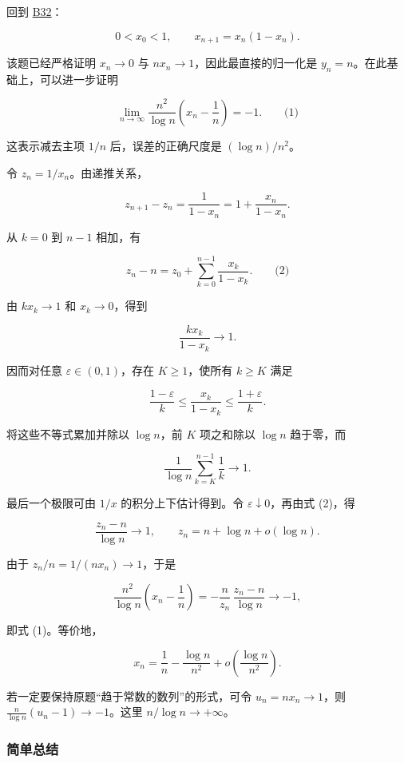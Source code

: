 \documentclass[11pt,a4paper]{article}
\begin{document}
回到
\href{https://zj139.github.io/math-notes/problems/e7f87e98efda5bacdd444c79/\#问题-b32}{B32}：

\[
0<x_0<1,\qquad x_{n+1}=x_n(1-x_n).
\]

该题已经严格证明 \(x_n\to0\) 与 \(nx_n\to1\)，因此最直接的归一化是
\(y_n=n\)。在此基础上，可以进一步证明

\[
\boxed{\lim_{n\to\infty}\frac{n^2}{\log n}\left(x_n-\frac1n\right)=-1.}
\qquad\text{(1)}
\]

这表示减去主项 \(1/n\) 后，误差的正确尺度是 \((\log n)/n^2\)。

令 \(z_n=1/x_n\)。由递推关系，

\[
z_{n+1}-z_n
=\frac1{1-x_n}
=1+\frac{x_n}{1-x_n}.
\]

从 \(k=0\) 到 \(n-1\) 相加，有

\[
z_n-n=z_0+\sum_{k=0}^{n-1}\frac{x_k}{1-x_k}.
\qquad\text{(2)}
\]

由 \(kx_k\to1\) 和 \(x_k\to0\)，得到

\[
\frac{kx_k}{1-x_k}\longrightarrow1.
\]

因而对任意 \(\varepsilon\in(0,1)\)，存在 \(K\ge1\)，使所有 \(k\ge K\)
满足

\[
\frac{1-\varepsilon}{k}
\le\frac{x_k}{1-x_k}
\le\frac{1+\varepsilon}{k}.
\]

将这些不等式累加并除以 \(\log n\)，前 \(K\) 项之和除以 \(\log n\)
趋于零，而

\[
\frac1{\log n}\sum_{k=K}^{n-1}\frac1k\longrightarrow1.
\]

最后一个极限可由 \(1/x\) 的积分上下估计得到。令
\(\varepsilon\downarrow0\)，再由式 (2)，得

\[
\frac{z_n-n}{\log n}\longrightarrow1,\qquad
z_n=n+\log n+o(\log n).
\]

由于 \(z_n/n=1/(nx_n)\to1\)，于是

\[
\frac{n^2}{\log n}\left(x_n-\frac1n\right)
=-\frac n{z_n}\,\frac{z_n-n}{\log n}\longrightarrow-1,
\]

即式 (1)。等价地，

\[
x_n=\frac1n-\frac{\log n}{n^2}
+o\left(\frac{\log n}{n^2}\right).
\]

若一定要保持原题``趋于常数的数列''的形式，可令 \(u_n=nx_n\to1\)，则
\(\frac n{\log n}(u_n-1)\to-1\)。这里 \(n/\log n\to+\infty\)。

\subsubsection{简单总结}\label{ux7b80ux5355ux603bux7ed3-6}
\end{document}
